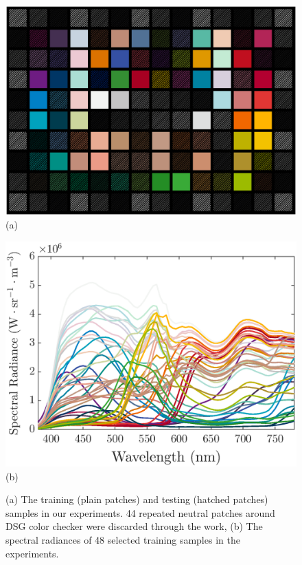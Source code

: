 \documentclass[9pt,twocolumn,twoside]{osajnl}
\providecommand{\DIFaddbeginFL}{} %
\providecommand{\DIFaddendFL}{} %
\providecommand{\DIFdelbeginFL}{} %
\providecommand{\DIFdelendFL}{} %
\begin{document}
\begin{figure}[tbp]
	\centering
	\begin{minipage}[b]{0.5\linewidth}
		\centering
		\DIFdelbeginFL %
\DIFdelendFL \DIFaddbeginFL \includegraphics[width=\linewidth]{Fig9a}\DIFaddendFL \\
		(a)
	\end{minipage}%
	\begin{minipage}[b]{0.5\linewidth}
		\centering
		\DIFdelbeginFL %
\DIFdelendFL \DIFaddbeginFL \includegraphics[width=\linewidth]{Fig9b}\DIFaddendFL \\
		(b)
	\end{minipage}
	\caption{(a) The training (plain patches) and testing (hatched patches) samples in our experiments. 44 repeated neutral patches around DSG color checker were discarded through the work, (b) The spectral radiances of 48 selected training samples in the experiments.}
	\DIFdelbeginFL %
\DIFdelendFL \DIFaddbeginFL \label{fig:9}
\DIFaddendFL \end{figure}
\end{document}

